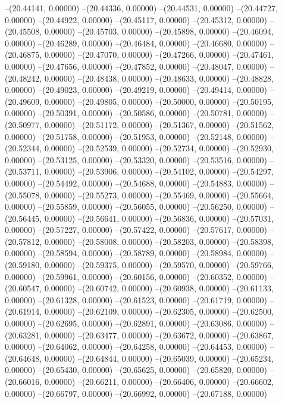 --(20.44141, 0.00000)
--(20.44336, 0.00000)
--(20.44531, 0.00000)
--(20.44727, 0.00000)
--(20.44922, 0.00000)
--(20.45117, 0.00000)
--(20.45312, 0.00000)
--(20.45508, 0.00000)
--(20.45703, 0.00000)
--(20.45898, 0.00000)
--(20.46094, 0.00000)
--(20.46289, 0.00000)
--(20.46484, 0.00000)
--(20.46680, 0.00000)
--(20.46875, 0.00000)
--(20.47070, 0.00000)
--(20.47266, 0.00000)
--(20.47461, 0.00000)
--(20.47656, 0.00000)
--(20.47852, 0.00000)
--(20.48047, 0.00000)
--(20.48242, 0.00000)
--(20.48438, 0.00000)
--(20.48633, 0.00000)
--(20.48828, 0.00000)
--(20.49023, 0.00000)
--(20.49219, 0.00000)
--(20.49414, 0.00000)
--(20.49609, 0.00000)
--(20.49805, 0.00000)
--(20.50000, 0.00000)
--(20.50195, 0.00000)
--(20.50391, 0.00000)
--(20.50586, 0.00000)
--(20.50781, 0.00000)
--(20.50977, 0.00000)
--(20.51172, 0.00000)
--(20.51367, 0.00000)
--(20.51562, 0.00000)
--(20.51758, 0.00000)
--(20.51953, 0.00000)
--(20.52148, 0.00000)
--(20.52344, 0.00000)
--(20.52539, 0.00000)
--(20.52734, 0.00000)
--(20.52930, 0.00000)
--(20.53125, 0.00000)
--(20.53320, 0.00000)
--(20.53516, 0.00000)
--(20.53711, 0.00000)
--(20.53906, 0.00000)
--(20.54102, 0.00000)
--(20.54297, 0.00000)
--(20.54492, 0.00000)
--(20.54688, 0.00000)
--(20.54883, 0.00000)
--(20.55078, 0.00000)
--(20.55273, 0.00000)
--(20.55469, 0.00000)
--(20.55664, 0.00000)
--(20.55859, 0.00000)
--(20.56055, 0.00000)
--(20.56250, 0.00000)
--(20.56445, 0.00000)
--(20.56641, 0.00000)
--(20.56836, 0.00000)
--(20.57031, 0.00000)
--(20.57227, 0.00000)
--(20.57422, 0.00000)
--(20.57617, 0.00000)
--(20.57812, 0.00000)
--(20.58008, 0.00000)
--(20.58203, 0.00000)
--(20.58398, 0.00000)
--(20.58594, 0.00000)
--(20.58789, 0.00000)
--(20.58984, 0.00000)
--(20.59180, 0.00000)
--(20.59375, 0.00000)
--(20.59570, 0.00000)
--(20.59766, 0.00000)
--(20.59961, 0.00000)
--(20.60156, 0.00000)
--(20.60352, 0.00000)
--(20.60547, 0.00000)
--(20.60742, 0.00000)
--(20.60938, 0.00000)
--(20.61133, 0.00000)
--(20.61328, 0.00000)
--(20.61523, 0.00000)
--(20.61719, 0.00000)
--(20.61914, 0.00000)
--(20.62109, 0.00000)
--(20.62305, 0.00000)
--(20.62500, 0.00000)
--(20.62695, 0.00000)
--(20.62891, 0.00000)
--(20.63086, 0.00000)
--(20.63281, 0.00000)
--(20.63477, 0.00000)
--(20.63672, 0.00000)
--(20.63867, 0.00000)
--(20.64062, 0.00000)
--(20.64258, 0.00000)
--(20.64453, 0.00000)
--(20.64648, 0.00000)
--(20.64844, 0.00000)
--(20.65039, 0.00000)
--(20.65234, 0.00000)
--(20.65430, 0.00000)
--(20.65625, 0.00000)
--(20.65820, 0.00000)
--(20.66016, 0.00000)
--(20.66211, 0.00000)
--(20.66406, 0.00000)
--(20.66602, 0.00000)
--(20.66797, 0.00000)
--(20.66992, 0.00000)
--(20.67188, 0.00000)
